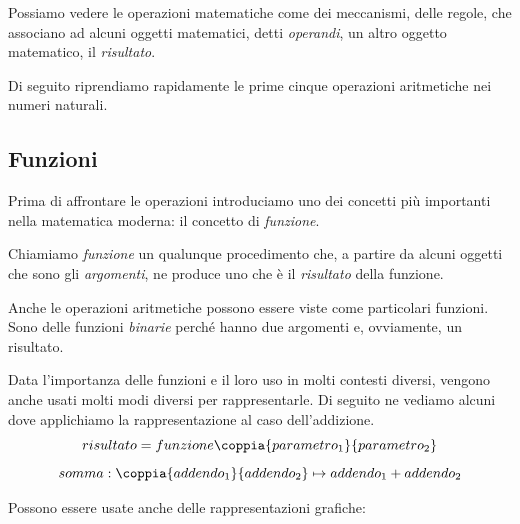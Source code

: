 Possiamo vedere le operazioni matematiche come dei meccanismi, delle regole, 
che associano ad alcuni oggetti matematici, detti \emph{operandi}, 
un altro oggetto matematico, il \emph{risultato}.

Di seguito riprendiamo rapidamente le prime cinque operazioni aritmetiche 
nei numeri naturali. 

\subsection{Funzioni}

Prima di affrontare le operazioni introduciamo uno dei concetti più importanti
nella matematica moderna: il concetto di \emph{funzione}.

\begin{definizione}{}{}
Chiamiamo \emph{funzione} un qualunque procedimento che, 
a partire da alcuni oggetti che sono gli \emph{argomenti}, 
ne produce uno che è il \emph{risultato} della funzione.
\end{definizione}

Anche le operazioni aritmetiche possono essere viste come particolari
funzioni. Sono delle funzioni \emph{binarie} perché hanno due argomenti e,
ovviamente, un risultato.

Data l'importanza delle funzioni e il loro uso in molti contesti diversi, 
vengono anche usati molti modi diversi per rappresentarle. 
Di seguito ne vediamo alcuni dove applichiamo la rappresentazione al caso
dell'addizione.
\[risultato = funzione \coppia{parametro_1}{parametro_2}\]
\[somma: \coppia{addendo_1}{addendo_2} \mapsto addendo_1 + addendo_2\]

Possono essere usate anche delle rappresentazioni grafiche:

